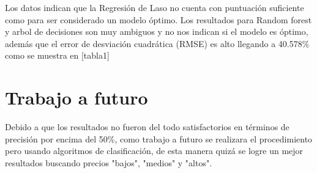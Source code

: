 \documentclass[conference]{IEEEtran}
\begin{document}
Los datos indican que la Regresión de Laso no cuenta con puntuación suficiente como para ser considerado un modelo óptimo.
Los resultados para Random forest y arbol de decisiones son muy ambiguos y no nos indican si el modelo es óptimo, además que el error de desviación cuadrática (RMSE) es alto llegando a 40.578\% como se muestra en [tabla1]

\section{Trabajo a futuro}
Debido a que los resultados no fueron del todo satisfactorios en términos de precisión por encima del 50\%, como trabajo a futuro se realizara el procedimiento pero usando algoritmos de clasificación, de esta manera quizá se logre un mejor resultados buscando precios "bajos", "medios" y "altos".
\vspace{5mm} %


\cite{Hyu2016,DWang2018,Schwarzova_undated-cm,Schwarzova2020-ud,Kalehbasti2020-sk}
\end{document}
